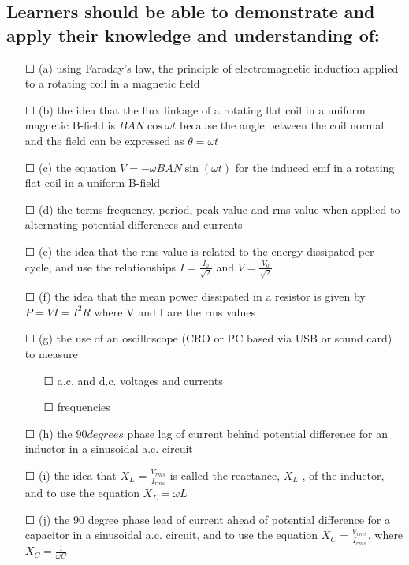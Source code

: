 \subsection*{Learners should be able to demonstrate and apply their knowledge and
	understanding of:}
\begin{itemize}
	\item[\Large{$\Square$}](a) using Faraday's law, the principle of electromagnetic induction applied to a
	rotating coil in a magnetic field
	
	\item[\Large{$\Square$}](b) the idea that the flux linkage of a rotating flat coil in a uniform magnetic
	B-field is \(BAN \cos \omega t\) because the angle between the coil normal and the field
	can be expressed as \(\theta=\omega t\)
	\item[\Large{$\Square$}](c) the equation \(V=-\omega BAN \sin (\omega t) \) for the induced emf in a rotating flat coil in a uniform B-field
	\item[\Large{$\Square$}](d) the terms frequency, period, peak value and rms value when applied to
	alternating potential differences and currents
	\item[\Large{$\Square$}](e) the idea that the rms value is related to the energy dissipated per cycle, and use the relationships \(I= \frac{I_0}{\sqrt{2}}\) and \(V= \frac{V_0}{\sqrt{2}}\)
	\item[\Large{$\Square$}](f) the idea that the mean power dissipated in a resistor is given by \(P=VI=I^{2}R\) where V and I are the rms values
	\item[\Large{$\Square$}](g) the use of an oscilloscope (CRO or PC based via USB or sound card) to
	measure
	\begin{itemize}
		\item[\Large{$\Square$}] a.c. and d.c. voltages and currents
		\item[\Large{$\Square$}] frequencies
	\end{itemize}
	\item[\Large{$\Square$}](h) the \(90 degrees\) phase lag of current behind potential difference for an inductor in a
	sinusoidal a.c. circuit
	\item[\Large{$\Square$}](i) the idea that \(X_{L}=\frac{V_{rms}}{I_{rms}}\)
	is called the reactance, \(X_{L}\) , of the inductor, and to
	use the equation \(X_{L}=\omega L \)
	\item[\Large{$\Square$}](j) the 90 degree  phase lead of current ahead of potential difference for a capacitor in a sinusoidal a.c. circuit, and to use the equation \( X_{C}= \frac{V_{rms}}{I_{rms}} \), where \( X_{C}= \frac{1}{\omega C} \)

\end{itemize}
